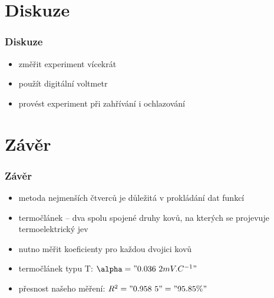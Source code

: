\documentclass[smaller,aspectratio=1610,handout]{beamer}
\begin{document}
\section{Diskuze}
\begin{frame}
	\frametitle{Diskuze}
	\begin{itemize}
		\item změřit experiment vícekrát
		\item použít digitální voltmetr
		\item provést experiment při zahřívání i ochlazování
	\end{itemize}
\end{frame}

\section{Závěr}
\begin{frame}
	\frametitle{Závěr}
	\begin{itemize}
		\item metoda nejmenších čtverců je důležitá v prokládání dat funkcí
		\item termočlánek -- dva spolu spojené druhy kovů, na kterých se
			projevuje termoelektrický jev
		\item nutno měřit koeficienty pro každou dvojici kovů
		\item termočlánek typu T: $\alpha = "0.036~2 mV.C^{-1}"$
		\item přesnost našeho měření: $R^2="0.958~5"="95.85 \%"$
	\end{itemize}
\end{frame}
\end{document}
